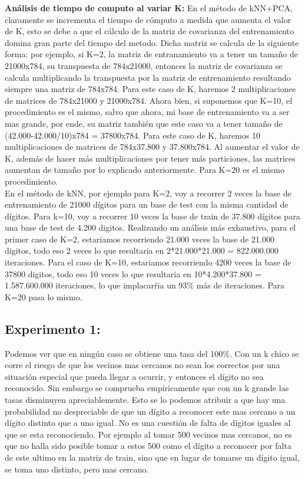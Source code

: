 \textbf{Análisis de tiempo de computo al variar K:}
 En el método de kNN+PCA, claramente se incrementa el tiempo de cómputo a medida que aumenta el valor de K, esto se debe a que el cálculo de la matriz de covarianza del entrenamiento domina gran parte del tiempo del metodo. Dicha matriz se calcula de la siguiente forma: por ejemplo, si K=2, la matriz de entranamiento va a tener un tamaño de 21000x784, su transpuesta de 784x21000, entonces la matriz de covarianza se calcula multiplicando la transpuesta por la matriz de entrenamiento resultando siempre una matriz de 784x784. Para este caso de K, haremos 2 multiplicaciones de matrices de 784x21000 y 21000x784. Ahora bien, si suponemos que K=10, el procedimiento es el mismo, salvo que ahora, mi base de entrenamiento va a ser mas grande, por ende, su matriz también que este caso va a tener tamaño de (42.000-42.000/10)x784 = 37800x784. Para este caso de K, haremos 10 multiplicaciones de matrices de 784x37.800 y 37.800x784. Al aumentar el valor de K, además de hacer más multiplicaciones por tener más particiones, las matrices aumentan de tamaño por lo explicado anteriormente. Para K=20 es el mismo procedimiento.\\
En el método de kNN, por ejemplo para K=2, voy a recorrer 2 veces la base de entrenamiento de 21000 dígitos para un base de test con la misma cantidad de dígitos. Para k=10, voy a recorrer 10 veces la base de train de 37.800 dígitos para una base de test de 4.200 digitos. Realizando un análisis más exhaustivo, para el primer caso de K=2, estariamos recorriendo 21.000 veces la base de 21.000 digitos, todo eso 2 veces lo que resultaria en 2*21.000*21.000 = 822.000.000 iteraciones. Para el caso de K=10, estariamos recorriendo 4200 veces la base de 37800 digitos, todo eso 10 veces lo que resultaria en 10*4.200*37.800 = 1.587.600.000 iteraciones, lo que implacarŕia un 93$\%$ más de iteraciones. Para K=20 pasa lo mismo.\\

 \subsection{Experimento 1:}

Podemos ver que en ningún caso se obtiene una tasa del 100$ \% $. Con un k chico se corre el riesgo de que los vecinos mas cercanos no sean los correctos por una situación especial que pueda llegar a ocurrir, y entonces el dígito no sea reconocido. Sin embargo se comprueba empíricamente que con un k grande las tasas disminuyen apreciablemente. Esto se lo podemos atribuir a que hay una probabilidad no despreciable de que un dígito a reconocer este mas cercano a un dígito distinto que a uno igual. No es una cuestión de falta de dígitos iguales al que se esta reconociendo. Por ejemplo al tomar 500 vecinos mas cercanos, no es que no halla sido posible tomar a estos 500 como el dígito a reconocer por falta de este ultimo en la matriz de train, sino que en lugar de tomarse un dígito igual, se toma uno distinto, pero mas cercano.


